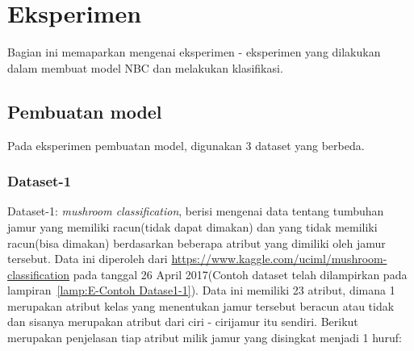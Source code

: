 \section{Eksperimen}
Bagian ini memaparkan mengenai eksperimen - eksperimen yang dilakukan dalam membuat model NBC dan melakukan klasifikasi.

\subsection{Pembuatan model}
Pada eksperimen pembuatan model, digunakan 3 dataset yang berbeda.

\subsubsection{Dataset-1}
Dataset-1: \textit{mushroom classification}, berisi mengenai data tentang tumbuhan jamur yang memiliki racun(tidak dapat dimakan) dan yang tidak memiliki racun(bisa dimakan) berdasarkan beberapa atribut yang dimiliki oleh jamur tersebut. Data ini diperoleh dari \url{https://www.kaggle.com/uciml/mushroom-classification} pada tanggal 26 April 2017(Contoh dataset telah dilampirkan pada lampiran~\ref{lamp:E-Contoh Datase1-1}). Data ini memiliki 23 atribut, dimana 1 merupakan atribut kelas yang menentukan jamur tersebut beracun atau tidak dan sisanya merupakan atribut dari ciri - cirijamur itu sendiri. Berikut merupakan penjelasan tiap atribut milik jamur yang disingkat menjadi 1 huruf:
